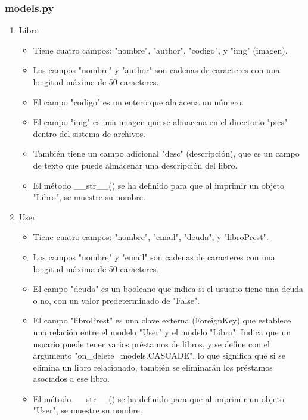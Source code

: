 \documentclass{article}
\begin{document}
	
	
	
	
	\subsubsection{models.py}
	
	
	\begin{enumerate}
		\item Libro
		
		\begin{itemize}
			\item Tiene cuatro campos: "nombre", "author", "codigo", y "img" (imagen).
			\item Los campos "nombre" y "author" son cadenas de caracteres con una longitud máxima de 50 caracteres.
			\item  El campo "codigo" es un entero que almacena un número.
			\item El campo "img" es una imagen que se almacena en el directorio "pics" dentro del sistema de archivos.
			\item También tiene un campo adicional "desc" (descripción), que es un campo de texto que puede almacenar una descripción del libro.
			\item El método \_\_str\_\_() se ha definido para que al imprimir un objeto "Libro", se muestre su nombre.
		\end{itemize}
		
		\item User
		\begin{itemize}
			\item Tiene cuatro campos: "nombre", "email", "deuda", y "libroPrest".
			\item Los campos "nombre" y "email" son cadenas de caracteres con una longitud máxima de 50 caracteres.
			\item  El campo "deuda" es un booleano que indica si el usuario tiene una deuda o no, con un valor predeterminado de "False".
			\item El campo "libroPrest" es una clave externa (ForeignKey) que establece una relación entre el modelo "User" y el modelo "Libro". Indica que un usuario puede tener varios préstamos de libros, y se define con el argumento "on\_delete=models.CASCADE", lo que significa que si se elimina un libro relacionado, también se eliminarán los préstamos asociados a ese libro.
			\item El método \_\_str\_\_() se ha definido para que al imprimir un objeto "User", se muestre su nombre.
		\end{itemize}
	\end{enumerate}
	
\end{document}
